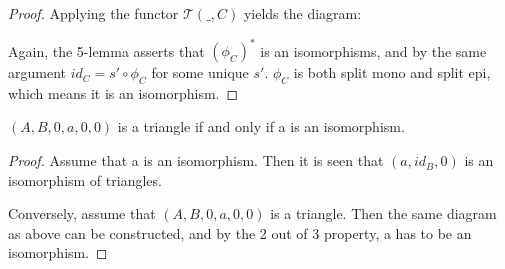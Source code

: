\begin{proof}
        Applying the functor $\mathcal{T}(\_,C)$ yields the diagram:
        \begin{center}
        \end{center}
        Again, the 5-lemma asserts that $(\phi_C)^*$ is an isomorphisms, and by the same argument $id_{C} = s'\circ\phi_C$ for some unique $s'$. $\phi_C$ is both split mono and split epi, which means it is an isomorphism.
    \end{proof}

    \begin{corollary}
        $(A,B,0,a,0,0)$ is a triangle if and only if a is an isomorphism.
    \end{corollary}

    \begin{proof}
        Assume that a is an isomorphism. Then it is seen that $(a,id_B,0)$ is an isomorphism of triangles.
        \begin{center}
        \end{center}
        Conversely, assume that $(A,B,0,a,0,0)$ is a triangle. Then the same diagram as above can be constructed, and by the 2 out of 3 property, a has to be an isomorphism.
    \end{proof}


